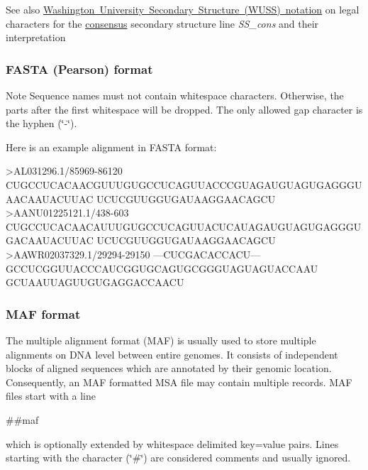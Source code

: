 \begin{DoxySeeAlso}{See also}
\mbox{\hyperlink{rna_structure_notations_wuss-notation}{Washington University Secondary Structure (W\+U\+SS) notation}} on legal characters for the \mbox{\hyperlink{group__aln__utils_ga8e8b805faaf6dee2feb4cbc38ba48e71}{consensus}} secondary structure line {\itshape S\+S\+\_\+cons} and their interpretation
\end{DoxySeeAlso}
\hypertarget{file_formats_msa-formats-fasta}{}\subsubsection{F\+A\+S\+T\+A (\+Pearson) format}\label{file_formats_msa-formats-fasta}
\begin{DoxyNote}{Note}
Sequence names must not contain whitespace characters. Otherwise, the parts after the first whitespace will be dropped. The only allowed gap character is the hyphen {\itshape }(\char`\"{}-\/\char`\"{}).
\end{DoxyNote}
Here is an example alignment in F\+A\+S\+TA format\+: 
\begin{DoxyVerbInclude}
>AL031296.1/85969-86120
CUGCCUCACAACGUUUGUGCCUCAGUUACCCGUAGAUGUAGUGAGGGUAACAAUACUUAC
UCUCGUUGGUGAUAAGGAACAGCU
>AANU01225121.1/438-603
CUGCCUCACAACAUUUGUGCCUCAGUUACUCAUAGAUGUAGUGAGGGUGACAAUACUUAC
UCUCGUUGGUGAUAAGGAACAGCU
>AAWR02037329.1/29294-29150
---CUCGACACCACU---GCCUCGGUUACCCAUCGGUGCAGUGCGGGUAGUAGUACCAAU
GCUAAUUAGUUGUGAGGACCAACU
\end{DoxyVerbInclude}
\hypertarget{file_formats_msa-formats-maf}{}\subsubsection{M\+A\+F format}\label{file_formats_msa-formats-maf}
The multiple alignment format (M\+AF) is usually used to store multiple alignments on D\+NA level between entire genomes. It consists of independent blocks of aligned sequences which are annotated by their genomic location. Consequently, an M\+AF formatted M\+SA file may contain multiple records. M\+AF files start with a line \begin{DoxyVerb}##maf
\end{DoxyVerb}
 which is optionally extended by whitespace delimited key=value pairs. Lines starting with the character (\char`\"{}\#\char`\"{}) are considered comments and usually ignored.

